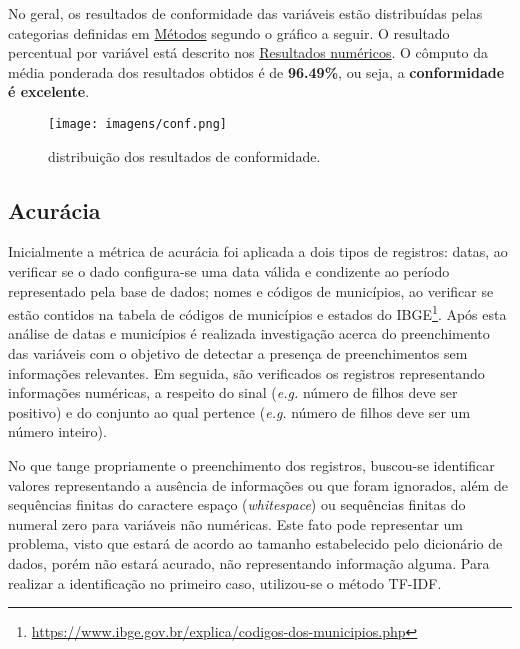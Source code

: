 \documentclass[
  12,
  table]{proadi}
\begin{document}
No geral, os resultados de conformidade das variáveis estão distribuídas
pelas categorias definidas em \protect\hyperlink{muxe9todos}{Métodos}
segundo o gráfico a seguir. O resultado percentual por variável está
descrito nos \protect\hyperlink{resultados-numuxe9ricos}{Resultados
numéricos}. O cômputo da média ponderada dos resultados obtidos é de
\textbf{96.49\%}, ou seja, a \textbf{conformidade é excelente}.

\begin{figure}
\centering
\texttt{[image: imagens/conf.png]}
\caption{distribuição dos resultados de conformidade.}
\end{figure}

\hypertarget{acuruxe1cia}{%
\subsection{Acurácia}\label{acuruxe1cia}}

Inicialmente a métrica de acurácia foi aplicada a dois tipos de
registros: datas, ao verificar se o dado configura-se uma data válida e
condizente ao período representado pela base de dados; nomes e códigos
de municípios, ao verificar se estão contidos na tabela de códigos de
municípios e estados do IBGE\footnote{\url{https://www.ibge.gov.br/explica/codigos-dos-municipios.php}}.
Após esta análise de datas e municípios é realizada investigação acerca
do preenchimento das variáveis com o objetivo de detectar a presença de
preenchimentos sem informações relevantes. Em seguida, são verificados
os registros representando informações numéricas, a respeito do sinal
(\emph{e.g.} número de filhos deve ser positivo) e do conjunto ao qual
pertence (\emph{e.g.} número de filhos deve ser um número inteiro).

No que tange propriamente o preenchimento dos registros, buscou-se
identificar valores representando a ausência de informações ou que foram
ignorados, além de sequências finitas do caractere espaço
(\emph{whitespace}) ou sequências finitas do numeral zero para variáveis
não numéricas. Este fato pode representar um problema, visto que estará
de acordo ao tamanho estabelecido pelo dicionário de dados, porém não
estará acurado, não representando informação alguma. Para realizar a
identificação no primeiro caso, utilizou-se o método TF-IDF.
\end{document}
